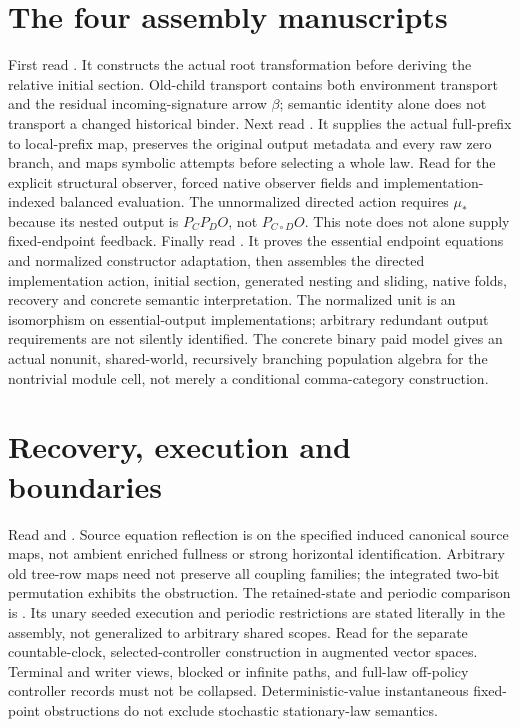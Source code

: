 \documentclass{article}
\begin{document}
\section{The four assembly manuscripts}
First read . It constructs the actual root transformation before deriving the relative initial section. Old-child transport contains both environment transport and the residual incoming-signature arrow $\beta$; semantic identity alone does not transport a changed historical binder.
Next read . It supplies the actual full-prefix to local-prefix map, preserves the original output metadata and every raw zero branch, and maps symbolic attempts before selecting a whole law.
Read  for the explicit structural observer, forced native observer fields and implementation-indexed balanced evaluation. The unnormalized directed action requires $\mu_*$ because its nested output is $P_CP_DO$, not $P_{C\circ D}O$. This note does not alone supply fixed-endpoint feedback.
Finally read . It proves the essential endpoint equations and normalized constructor adaptation, then assembles the directed implementation action, initial section, generated nesting and sliding, native folds, recovery and concrete semantic interpretation. The normalized unit is an isomorphism on essential-output implementations; arbitrary redundant output requirements are not silently identified. The concrete binary paid model gives an actual nonunit, shared-world, recursively branching population algebra for the nontrivial module cell, not merely a conditional comma-category construction.
\section{Recovery, execution and boundaries}
Read  and . Source equation reflection is on the specified induced canonical source maps, not ambient enriched fullness or strong horizontal identification. Arbitrary old tree-row maps need not preserve all coupling families; the integrated two-bit permutation exhibits the obstruction.
The retained-state and periodic comparison is . Its unary seeded execution and periodic restrictions are stated literally in the assembly, not generalized to arbitrary shared scopes. Read  for the separate countable-clock, selected-controller construction in augmented vector spaces. Terminal and writer views, blocked or infinite paths, and full-law off-policy controller records must not be collapsed. Deterministic-value instantaneous fixed-point obstructions do not exclude stochastic stationary-law semantics.
\end{document}
